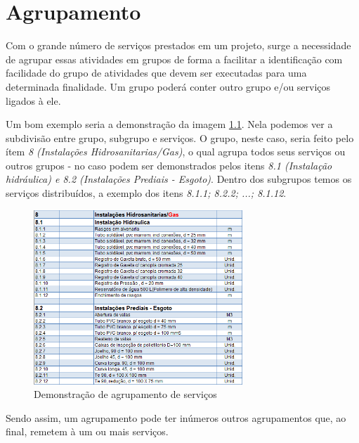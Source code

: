 \chapter{Agrupamento}

Com o grande número de serviços prestados em um projeto, surge a necessidade de agrupar essas atividades em grupos de forma a facilitar a identificação com facilidade do grupo de atividades que devem ser executadas para uma determinada finalidade. Um grupo poderá conter outro grupo e/ou serviços ligados à ele.

Um bom exemplo seria a demonstração da imagem \ref{fig:agrupamento}. Nela podemos ver a subdivisão entre grupo, subgrupo e serviços. O grupo, neste caso, seria feito pelo ítem \emph{8 (Instalações Hidrosanitarias/Gas)}, o qual agrupa todos seus serviços ou outros grupos - no caso podem ser demonstrados pelos itens \emph{8.1 (Instalação hidráulica) e 8.2 (Instalações Prediais - Esgoto)}. Dentro dos subgrupos temos os serviços  distribuídos, a exemplo dos itens \emph{8.1.1; 8.2.2; ...; 8.1.12}.

\begin{figure}[htb]
\centering
\includegraphics[width=0.7\textwidth]{figuras/agrupamento.png}
\caption{Demonstração de agrupamento de serviços}
\label{fig:agrupamento}
\end{figure}

Sendo assim, um agrupamento pode ter inúmeros outros agrupamentos que, ao final, remetem à um ou mais serviços.